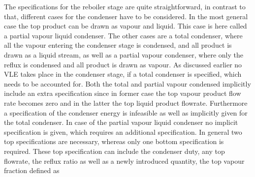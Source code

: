         The specifications for the reboiler stage are quite straightforward, in contrast to that,
        different cases for the condenser have to be considered. In the most general case the
        top product can be drawn as vapour and liquid. This case is here called a partial vapour
        liquid condenser. The other cases are a total condenser, where all the vapour entering the
        condenser stage is condensed, and all product is drawn as a liquid stream, as well as
        a partial vapour condenser, where only the reflux is condensed and all product is drawn
        as vapour. As discussed earlier no VLE takes place in the condenser stage, if a total
        condenser is specified, which needs to be accounted for. Both the total and partial
        vapour condensed implicitly include an extra specification since in former case
        the top vapour product flow rate becomes zero and in the latter the top liquid product
        flowrate. Furthermore a specification of the condenser energy is infeasible as well as implicitly
        given for the total condenser. In case of the partial vapour liquid condenser no implicit
        specification is given, which requires an additional specification. In general two
        top specifications are necessary, whereas only one bottom specification is required.
        These top specification can include the condenser duty, any top flowrate, the reflux ratio
        as well as a newly introduced quantity, the top vapour fraction defined as

